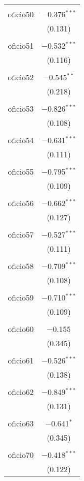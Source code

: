 \begin{table}[!htbp]
\begin{tabular}{@{\extracolsep{5pt}}lc}
  & \\ 
 oficio50 & $-$0.376$^{***}$ \\ 
  & (0.131) \\ 
  & \\ 
 oficio51 & $-$0.532$^{***}$ \\ 
  & (0.116) \\ 
  & \\ 
 oficio52 & $-$0.545$^{**}$ \\ 
  & (0.218) \\ 
  & \\ 
 oficio53 & $-$0.826$^{***}$ \\ 
  & (0.108) \\ 
  & \\ 
 oficio54 & $-$0.631$^{***}$ \\ 
  & (0.111) \\ 
  & \\ 
 oficio55 & $-$0.795$^{***}$ \\ 
  & (0.109) \\ 
  & \\ 
 oficio56 & $-$0.662$^{***}$ \\ 
  & (0.127) \\ 
  & \\ 
 oficio57 & $-$0.527$^{***}$ \\ 
  & (0.111) \\ 
  & \\ 
 oficio58 & $-$0.709$^{***}$ \\ 
  & (0.108) \\ 
  & \\ 
 oficio59 & $-$0.710$^{***}$ \\ 
  & (0.109) \\ 
  & \\ 
 oficio60 & $-$0.155 \\ 
  & (0.345) \\ 
  & \\ 
 oficio61 & $-$0.526$^{***}$ \\ 
  & (0.138) \\ 
  & \\ 
 oficio62 & $-$0.849$^{***}$ \\ 
  & (0.131) \\ 
  & \\ 
 oficio63 & $-$0.641$^{*}$ \\ 
  & (0.345) \\ 
  & \\ 
 oficio70 & $-$0.418$^{***}$ \\ 
  & (0.122) \\ 

\end{tabular}
\end{table}
